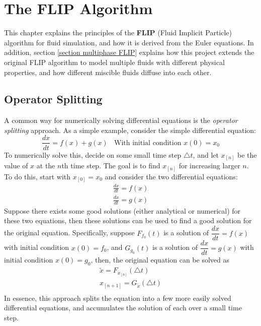 \chapter{The FLIP Algorithm}
\label{chapter grid}

This chapter explains the principles of the \textbf{FLIP} (Fluid Implicit Particle) algorithm for fluid simulation, and how it is derived from the Euler equations. In addition, section \ref{section multiphase FLIP} explains how this project extends the original FLIP algorithm to model multiple fluids with different physical properties, and how different miscible fluids diffuse into each other.


\section{Operator Splitting}
\label{section splitting}
A common way for numerically solving differential equations is the \textit{operator splitting} approach. As a simple example, consider the simple differential equation:
$$
\frac{dx}{dt} = f(x)+g(x) ~~~~\mbox{With initial condition $x(0)=x_0$}
$$
To numerically solve this, decide on some small time step $\triangle t$, and let $x_{[n]}$ be the value of $x$ at the $n$th time step. The goal is to find $x_{[n]}$ for increasing larger $n$. To do this, start with $x_{[0]}=x_0$ and consider the two differential equations:
\begin{equation*}
    \begin{aligned}
        \frac{dx}{dt} = f(x)\\
        \frac{dx}{dt} = g(x)
    \end{aligned}
\end{equation*}
Suppose there exists some good solutions (either analytical or numerical) for these two equations, then these solutions can be used to find a good solution for the original equation. Specifically, suppose $F_{f_0}(t)$ is a solution of $\dfrac{dx}{dt} = f(x)$ with initial condition $x(0)=f_0$, and $G_{g_0}(t)$ is a solution of $\dfrac{dx}{dt} = g(x)$ with initial condition $x(0)=g_0$, then, the original equation can be solved as 
\begin{equation*}
    \begin{aligned}
        \widetilde{x} = F_{x_{[n]}}(\triangle t) \\
        x_{[n+1]} = G_{\widetilde{x}}(\triangle t) \\
    \end{aligned}
\end{equation*}
In essence, this approach splits the equation into a few more easily solved differential equations, and accumulates the solution of each over a small time step. 

